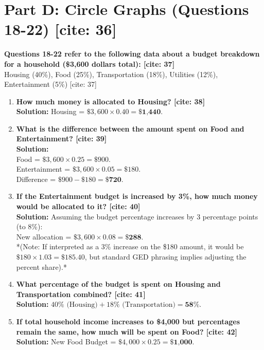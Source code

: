 \documentclass[11pt]{article}
\begin{document}
\section*{Part D: Circle Graphs (Questions 18-22) [cite: 36]}

\noindent \textbf{Questions 18-22 refer to the following data about a budget breakdown for a household (\$3,600 dollars total): [cite: 37]} \\
Housing (40\%), Food (25\%), Transportation (18\%), Utilities (12\%), Entertainment (5\%) [cite: 37]

\begin{enumerate}[resume]
    \item \textbf{How much money is allocated to Housing? [cite: 38]} \\
    \textbf{Solution:} Housing = $\$3,600 \times 0.40 = \textbf{\$1,440}$.
    
    \item \textbf{What is the difference between the amount spent on Food and Entertainment? [cite: 39]} \\
    \textbf{Solution:} \\
    Food = $\$3,600 \times 0.25 = \$900$. \\
    Entertainment = $\$3,600 \times 0.05 = \$180$. \\
    Difference = $\$900 - \$180 = \textbf{\$720}$.
    
    \item \textbf{If the Entertainment budget is increased by 3\%, how much money would be allocated to it? [cite: 40]} \\
    \textbf{Solution:} Assuming the budget percentage increases by 3 percentage points (to 8\%): \\
    New allocation = $\$3,600 \times 0.08 = \textbf{\$288}$. \\
    *(Note: If interpreted as a 3\% increase on the \$180 amount, it would be $\$180 \times 1.03 = \$185.40$, but standard GED phrasing implies adjusting the percent share).*
    
    \item \textbf{What percentage of the budget is spent on Housing and Transportation combined? [cite: 41]} \\
    \textbf{Solution:} $40\% \text{ (Housing)} + 18\% \text{ (Transportation)} = \textbf{58\%}$.
    
    \item \textbf{If total household income increases to \$4,000 but percentages remain the same, how much will be spent on Food? [cite: 42]} \\
    \textbf{Solution:} New Food Budget = $\$4,000 \times 0.25 = \textbf{\$1,000}$.
\end{enumerate}
\end{document}
